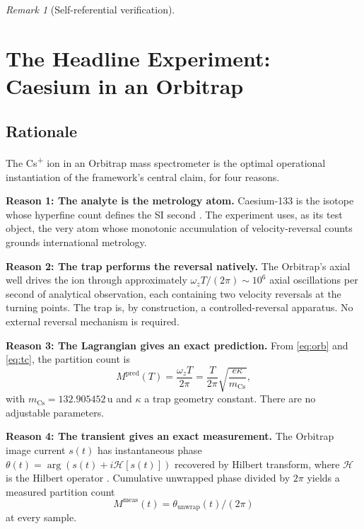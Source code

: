 \documentclass[twocolumn,10pt,a4paper]{article}
\theoremstyle{thmstyle}
\theoremstyle{definition}
\theoremstyle{remark}
\newtheorem{remark}[theorem]{Remark}
\begin{document}
\begin{remark}[Self-referential verification]
\section{The Headline Experiment: Caesium in an Orbitrap}
\label{sec:experiment}

\subsection{Rationale}

The Cs\textsuperscript{+} ion in an Orbitrap mass spectrometer is the
optimal operational instantiation of the framework's central claim,
for four reasons.

\textbf{Reason 1: The analyte is the metrology atom.} Caesium-133 is
the isotope whose hyperfine count defines the SI second
\citep{si2019}. The experiment uses, as its test object, the very
atom whose monotonic accumulation of velocity-reversal counts grounds
international metrology.

\textbf{Reason 2: The trap performs the reversal natively.} The
Orbitrap's axial well drives the ion through approximately
$\omega_{z}T/(2\pi)\sim 10^{6}$ axial oscillations per second of
analytical observation, each containing two velocity reversals at the
turning points. The trap is, by construction, a controlled-reversal
apparatus. No external reversal mechanism is required.

\textbf{Reason 3: The Lagrangian gives an exact prediction.} From
\eqref{eq:orb} and \eqref{eq:tc}, the partition count is
\begin{equation}
M^{\mathrm{pred}}(T)=\frac{\omega_{z}T}{2\pi}=\frac{T}{2\pi}\sqrt{\frac{e\kappa}{m_{\mathrm{Cs}}}},
\label{eq:Mpred}
\end{equation}
with $m_{\mathrm{Cs}}=132.905452\,\mathrm{u}$ \citep{atomicmasses2020}
and $\kappa$ a trap geometry constant. There are no adjustable
parameters.

\textbf{Reason 4: The transient gives an exact measurement.} The
Orbitrap image current $s(t)$ has instantaneous phase
$\theta(t)=\arg(s(t)+i\mathcal{H}[s(t)])$ recovered by Hilbert
transform, where $\mathcal{H}$ is the Hilbert operator \citep{gabor1946}.
Cumulative unwrapped phase divided by $2\pi$ yields a measured
partition count
\begin{equation}
M^{\mathrm{meas}}(t)=\theta_{\mathrm{unwrap}}(t)/(2\pi)
\label{eq:Mmeas}
\end{equation}
at every sample.


\end{remark}
\end{document}
